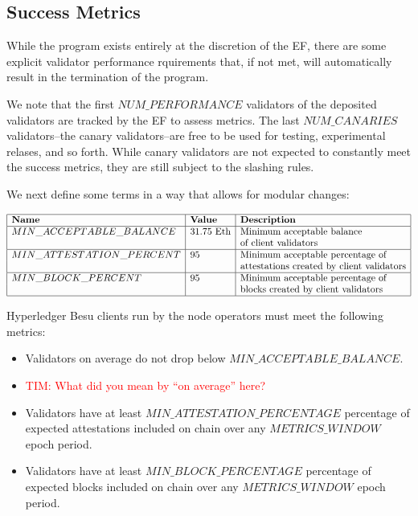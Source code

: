 \subsection{Success Metrics}
While the program exists entirely at the discretion of the EF, there are some explicit validator performance rquirements that, if not met, will automatically result in the termination of the program.

We note that the first $NUM\_PERFORMANCE$ validators of the deposited validators are tracked by the EF to assess metrics.  The last $NUM\_CANARIES$ validators--the canary validators--are free to be used for testing, experimental relases, and so forth.  While canary validators are not expected to constantly meet the success metrics, they are still subject to the slashing rules.

We next define some terms in a way that allows for modular changes:

\[
\begin{array}{|l|l|l|}
\hline
\textbf{Name} & \textbf{Value} & \textbf{Description} \\
\hline
MIN\_ACCEPTABLE\_BALANCE & 31.75 \text{ Eth} & \text{Minimum acceptable balance} \\
& & \text{of client validators} \\
\hline
MIN\_ATTESTATION\_PERCENT & 95 & \text{Minimum acceptable percentage of} \\
& & \text{attestations created by client validators} \\
\hline
MIN\_BLOCK\_PERCENT & 95 & \text{Minimum acceptable percentage of} \\
& & \text{blocks created by client validators} \\
\hline
\end{array}
\]

Hyperledger Besu clients run by the node operators must meet the following metrics:
\begin{itemize}
\item Validators on average do not drop below $MIN\_ACCEPTABLE\_BALANCE$.
\item \textcolor{red}{TIM:  What did you mean by ``on average'' here?}
\item Validators have at least $MIN\_ATTESTATION\_PERCENTAGE$ percentage of expected attestations included on chain over any $METRICS\_WINDOW$ epoch period.
\item Validators have at least $MIN\_BLOCK\_PERCENTAGE$ percentage of expected blocks included on chain over any $METRICS\_WINDOW$ epoch period.
\end{itemize}

